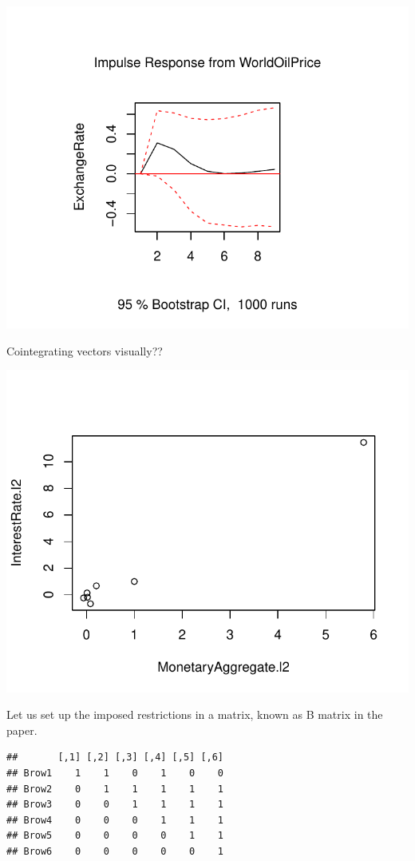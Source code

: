 \documentclass[11pt,preprint, authoryear]{elsarticle}
\numberwithin{equation}{section}
\numberwithin{figure}{section}
\numberwithin{table}{section}
\begin{document}
\begin{center}\includegraphics{README_files/figure-latex/unnamed-chunk-5-5} \end{center}

Cointegrating vectors visually??

\begin{center}\includegraphics{README_files/figure-latex/unnamed-chunk-7-1} \end{center}

Let us set up the imposed restrictions in a matrix, known as B matrix in
the paper.

\begin{verbatim}
##       [,1] [,2] [,3] [,4] [,5] [,6]
## Brow1    1    1    0    1    0    0
## Brow2    0    1    1    1    1    1
## Brow3    0    0    1    1    1    1
## Brow4    0    0    0    1    1    1
## Brow5    0    0    0    0    1    1
## Brow6    0    0    0    0    0    1
\end{verbatim}
\end{document}

